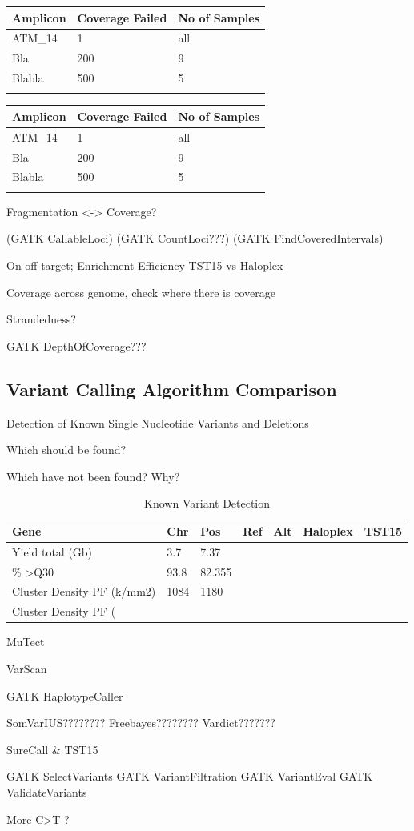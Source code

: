 \begin{minipage}{0.5\textwidth}
\begin{tabular}{p{1.5cm} p{1.5cm} p{1.5cm}}\\
\hline
Amplicon & Coverage Failed & No of Samples \\
\hline
ATM_14 & 1 & all \\
Bla & 200 & 9 \\
Blabla & 500 & 5 \\
\label{failed_hpx}
\end{tabular}
\end{minipage}
\hfill
\begin{minipage}{0.5\textwidth}
\begin{tabular}{p{3cm} p{1.5cm} p{1.5cm}}\\
\hline
Amplicon & Coverage Failed & No of Samples \\
\hline
ATM_14 & 1 & all \\
Bla & 200 & 9 \\
Blabla & 500 & 5 \\
\label{failed_tst}
\end{tabular}
\end{minipage}

Fragmentation <-> Coverage?

(GATK CallableLoci)
(GATK CountLoci???)
(GATK FindCoveredIntervals)

On-off target; Enrichment Efficiency TST15 vs Haloplex

Coverage across genome, check where there is coverage

Strandedness?

GATK DepthOfCoverage???

\subsection{Variant Calling Algorithm Comparison}
Detection of Known Single Nucleotide Variants and Deletions

Which should be found?

Which have not been found? Why?

\begin{table}[!htbp]
  \caption[known_variants]{Known Variant Detection}
  \centering
    \begin{tabular}{ |p{4cm}||p{4cm}||p{4cm}|}
    \hline
    Gene & Chr & Pos & Ref & Alt & Haloplex & TST15 \\ \hline \hline
    Yield total (Gb) & 3.7 & 7.37 \\ \hline
    \% \textgreater Q30 & 93.8 & 82.355 \\ \hline
    Cluster Density PF (k/mm2) & 1084 & 1180  \\ \hline
    Cluster Density PF (%
  \end{tabular}
\end{table}

MuTect

VarScan

GATK HaplotypeCaller

SomVarIUS????????
Freebayes????????
Vardict???????

SureCall & TST15

GATK SelectVariants
GATK VariantFiltration
GATK VariantEval
GATK ValidateVariants

More C>T ?
